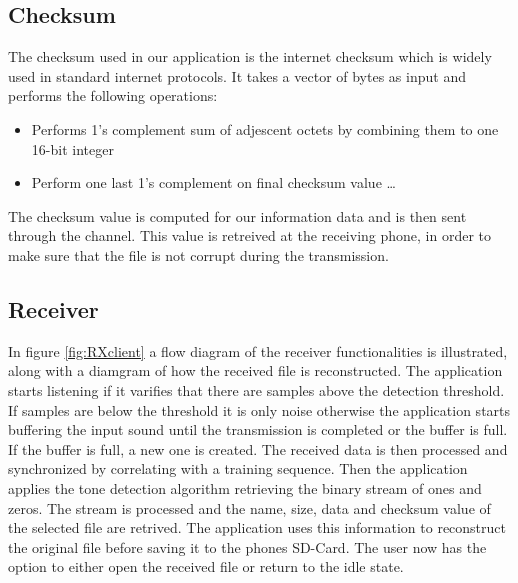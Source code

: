 \documentclass[12pt,a4paper,openright]{report}
\begin{document}
\subsection{Checksum}

The checksum used in our application is the internet checksum which is widely used in standard internet protocols. It takes a vector of bytes as input and performs the following operations:

\begin{itemize}
  \item Performs 1's complement sum of adjescent octets by combining them to one 16-bit integer
  \item Perform one last 1's complement on final checksum value \ldots
\end{itemize}

The checksum value is computed for our information data and is then sent through the channel. This value is retreived at the receiving phone, in order to make sure that the file is not corrupt during the transmission.


\subsection{Receiver}

In figure \ref{fig:RXclient} a flow diagram of the receiver functionalities is illustrated, along with a diamgram of how the received file is reconstructed. The application starts listening if it varifies that there are samples above the detection threshold. If samples are below the threshold it is only noise otherwise the application starts buffering the input sound until the transmission is completed or the buffer is full. If the buffer is full, a new one is created. The received data is then processed and synchronized by correlating with a training sequence. Then the application applies the tone detection algorithm retrieving the binary stream of ones and zeros. The stream is processed and the name, size, data and checksum value of the selected file are retrived. The application uses this information to reconstruct the original file before saving it to the phones SD-Card. The user now has the option to either open the received file or return to the idle state.
\end{document}
